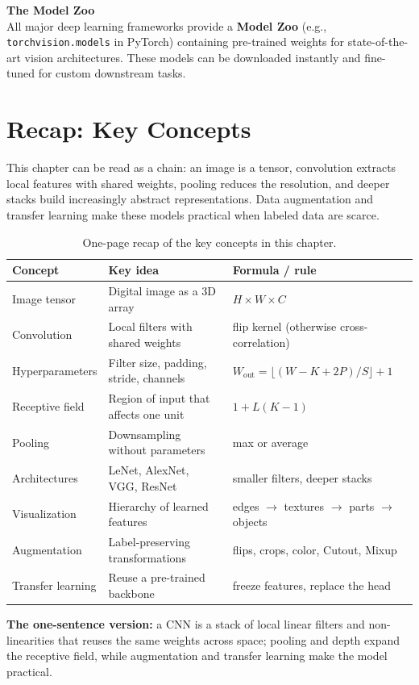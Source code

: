 \begin{keywordbox}
\textbf{The Model Zoo} \\
All major deep learning frameworks provide a \textbf{Model Zoo} (e.g., \texttt{torchvision.models} in PyTorch) containing pre-trained weights for state-of-the-art vision architectures. These models can be downloaded instantly and fine-tuned for custom downstream tasks.
\end{keywordbox}

\newpage
\section{Recap: Key Concepts}

This chapter can be read as a chain: an image is a tensor, convolution extracts local features with shared weights, pooling reduces the resolution, and deeper stacks build increasingly abstract representations. Data augmentation and transfer learning make these models practical when labeled data are scarce.

\begin{table}[htbp]
\centering
\small
\renewcommand{\arraystretch}{1.2}
\begin{tabular}{p{} p{} p{}}
\toprule
\textbf{Concept} & \textbf{Key idea} & \textbf{Formula / rule} \\
\midrule
Image tensor & Digital image as a 3D array & $H \times W \times C$ \\
Convolution & Local filters with shared weights & flip kernel (otherwise cross-correlation) \\
Hyperparameters & Filter size, padding, stride, channels & $W_{\text{out}} = \lfloor (W-K+2P)/S \rfloor + 1$ \\
Receptive field & Region of input that affects one unit & $1 + L(K-1)$ \\
Pooling & Downsampling without parameters & max or average \\
Architectures & LeNet, AlexNet, VGG, ResNet & smaller filters, deeper stacks \\
Visualization & Hierarchy of learned features & edges $\to$ textures $\to$ parts $\to$ objects \\
Augmentation & Label-preserving transformations & flips, crops, color, Cutout, Mixup \\
Transfer learning & Reuse a pre-trained backbone & freeze features, replace the head \\
\bottomrule
\end{tabular}
\caption{One-page recap of the key concepts in this chapter.}\label{tab:ch2_recap}
\end{table}

\begin{InsightBox}
\textbf{The one-sentence version:} a CNN is a stack of local linear filters and non-linearities that reuses the same weights across space; pooling and depth expand the receptive field, while augmentation and transfer learning make the model practical.
\end{InsightBox}
